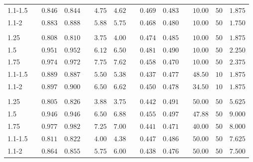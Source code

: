 \documentclass{article}\usepackage[]{graphicx}\usepackage[]{color}
\begin{document}
\begin{table}[H]
\begin{center}
\begin{tabular}{lcrrcrrcrrcrrr}
1.1-1.5&&$0.846$&$0.844$&&$4.75$&$4.62$&&$0.469$&$0.483$&&$10.00$&$50$&$ 1.875$\tabularnewline
1.1-2&&$0.883$&$0.888$&&$5.88$&$5.75$&&$0.468$&$0.480$&&$10.00$&$50$&$ 1.750$\tabularnewline
\hline
&&&&&&&&&&&&&\tabularnewline
1.25&&$0.808$&$0.810$&&$3.75$&$4.00$&&$0.474$&$0.485$&&$10.00$&$50$&$ 1.875$\tabularnewline
1.5&&$0.951$&$0.952$&&$6.12$&$6.50$&&$0.481$&$0.490$&&$10.00$&$50$&$ 2.250$\tabularnewline
1.75&&$0.974$&$0.972$&&$7.75$&$7.62$&&$0.458$&$0.470$&&$10.00$&$50$&$ 2.375$\tabularnewline
1.1-1.5&&$0.889$&$0.887$&&$5.50$&$5.38$&&$0.437$&$0.477$&&$48.50$&$10$&$ 1.875$\tabularnewline
1.1-2&&$0.897$&$0.900$&&$6.50$&$6.62$&&$0.450$&$0.478$&&$34.50$&$10$&$ 1.875$\tabularnewline
\hline
&&&&&&&&&&&&&\tabularnewline
1.25&&$0.805$&$0.826$&&$3.88$&$3.75$&&$0.442$&$0.491$&&$50.00$&$50$&$ 5.625$\tabularnewline
1.5&&$0.946$&$0.946$&&$6.50$&$6.88$&&$0.455$&$0.497$&&$47.88$&$50$&$ 9.000$\tabularnewline
1.75&&$0.977$&$0.982$&&$7.25$&$7.00$&&$0.441$&$0.471$&&$40.00$&$50$&$ 8.000$\tabularnewline
1.1-1.5&&$0.811$&$0.822$&&$4.00$&$4.38$&&$0.447$&$0.486$&&$50.00$&$50$&$ 7.625$\tabularnewline
1.1-2&&$0.864$&$0.855$&&$5.75$&$6.00$&&$0.438$&$0.476$&&$50.00$&$50$&$ 7.500$\tabularnewline
\hline
\end{tabular}
\end{center}
\end{table}
\end{document}
